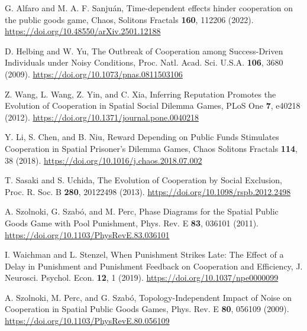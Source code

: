 \begin{thebibliography}{04}
G. Alfaro and M. A. F. Sanjuán,
Time-dependent effects hinder cooperation on the public goods game,
Chaos, Solitons Fractals \textbf{160}, 112206 (2022).
\url{https://doi.org/10.48550/arXiv.2501.12188}


D. Helbing and W. Yu, The Outbreak of Cooperation among Success-Driven Individuals under Noisy Conditions, Proc. Natl. Acad. Sci. U.S.A. \textbf{106}, 3680 (2009). \url{https://doi.org/10.1073/pnas.0811503106}

Z. Wang, L. Wang, Z. Yin, and C. Xia, Inferring Reputation Promotes the Evolution of Cooperation in Spatial Social Dilemma Games, PLoS One \textbf{7}, e40218 (2012). \url{https://doi.org/10.1371/journal.pone.0040218}

Y. Li, S. Chen, and B. Niu, Reward Depending on Public Funds Stimulates Cooperation in Spatial Prisoner’s Dilemma Games, Chaos Solitons Fractals \textbf{114}, 38 (2018). \url{https://doi.org/10.1016/j.chaos.2018.07.002}

T. Sasaki and S. Uchida, The Evolution of Cooperation by Social Exclusion, Proc. R. Soc. B \textbf{280}, 20122498 (2013). \url{https://doi.org/10.1098/rspb.2012.2498}

A. Szolnoki, G. Szabó, and M. Perc, Phase Diagrams for the Spatial Public Goods Game with Pool Punishment, Phys. Rev. E \textbf{83}, 036101 (2011). \url{https://doi.org/10.1103/PhysRevE.83.036101}

I. Waichman and L. Stenzel, When Punishment Strikes Late: The Effect of a Delay in Punishment and Punishment Feedback on Cooperation and Efficiency, J. Neurosci. Psychol. Econ. \textbf{12}, 1 (2019). \url{https://doi.org/10.1037/npe0000099}

A. Szolnoki, M. Perc, and G. Szabó, Topology-Independent Impact of Noise on Cooperation in Spatial Public Goods Games, Phys. Rev. E \textbf{80}, 056109 (2009). \url{https://doi.org/10.1103/PhysRevE.80.056109}




\end{thebibliography}







